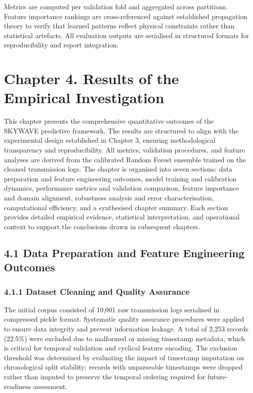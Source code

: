 Metrics are computed per validation fold and aggregated across
partitions. Feature importance rankings are cross-referenced against
established propagation theory to verify that learned patterns reflect
physical constraints rather than statistical artefacts. All evaluation
outputs are serialised in structured formats for reproducibility and
report integration.

\section{Chapter 4. Results of the Empirical
Investigation}\label{chapter-4.-results-of-the-empirical-investigation}

This chapter presents the comprehensive quantitative outcomes of the
SKYWAVE predictive framework. The results are structured to align with
the experimental design established in Chapter 3, ensuring
methodological transparency and reproducibility. All metrics, validation
procedures, and feature analyses are derived from the calibrated Random
Forest ensemble trained on the cleaned transmission logs. The chapter is
organised into seven sections: data preparation and feature engineering
outcomes, model training and calibration dynamics, performance metrics
and validation comparison, feature importance and domain alignment,
robustness analysis and error characterisation, computational
efficiency, and a synthesised chapter summary. Each section provides
detailed empirical evidence, statistical interpretation, and operational
context to support the conclusions drawn in subsequent chapters.

\subsection{4.1 Data Preparation and Feature Engineering
Outcomes}\label{data-preparation-and-feature-engineering-outcomes}

\subsubsection{4.1.1 Dataset Cleaning and Quality
Assurance}\label{dataset-cleaning-and-quality-assurance}

The initial corpus consisted of 10,001 raw transmission logs serialised
in compressed pickle format. Systematic quality assurance procedures
were applied to ensure data integrity and prevent information leakage. A
total of 2,253 records (22.5\%) were excluded due to malformed or
missing timestamp metadata, which is critical for temporal validation
and cyclical feature encoding. The exclusion threshold was determined by
evaluating the impact of timestamp imputation on chronological split
stability; records with unparseable timestamps were dropped rather than
imputed to preserve the temporal ordering required for future-readiness
assessment.

